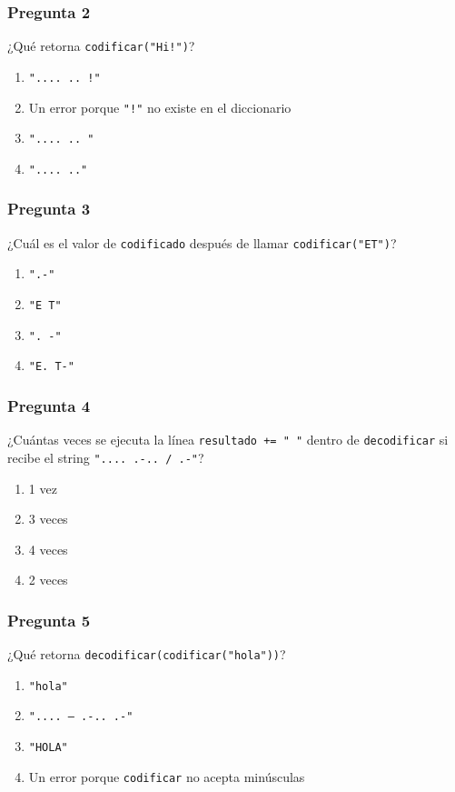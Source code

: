 \subsubsection*{Pregunta 2}

¿Qué retorna \texttt{codificar("Hi!")}?

\begin{enumerate}[label=\alph*)]
    \item \texttt{".... .. !"}
    \item Un error porque \texttt{"!"} no existe en el diccionario
    \item \texttt{".... .. "}
    \item \texttt{".... .."}
\end{enumerate}

\subsubsection*{Pregunta 3}

¿Cuál es el valor de \texttt{codificado} después de llamar \texttt{codificar("ET")}?

\begin{enumerate}[label=\alph*)]
    \item \texttt{".-"}
    \item \texttt{"E T"}
    \item \texttt{". -"}
    \item \texttt{"E. T-"}
\end{enumerate}

\subsubsection*{Pregunta 4}

¿Cuántas veces se ejecuta la línea \texttt{resultado += " "} dentro de \texttt{decodificar} si recibe el string \texttt{".... .-.. / .-"}?

\begin{enumerate}[label=\alph*)]
    \item 1 vez
    \item 3 veces
    \item 4 veces
    \item 2 veces
\end{enumerate}

\subsubsection*{Pregunta 5}

¿Qué retorna \texttt{decodificar(codificar("hola"))}?

\begin{enumerate}[label=\alph*)]
    \item \texttt{"hola"}
    \item \texttt{".... --- .-.. .-"}
    \item \texttt{"HOLA"}
    \item Un error porque \texttt{codificar} no acepta minúsculas
\end{enumerate}
